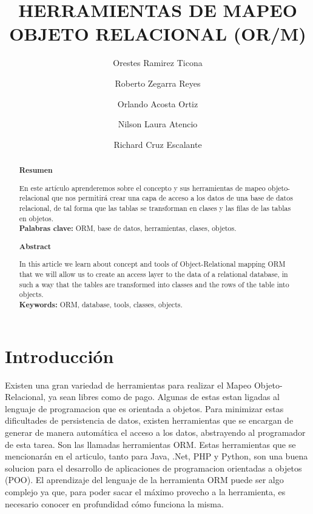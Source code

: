 \documentclass[%
 reprint,
 amsmath,amssymb,
 aps,
]{revtex4-1}
\begin{document}
\title{HERRAMIENTAS DE MAPEO OBJETO RELACIONAL (OR/M)}
\author{Orestes Ramirez Ticona}
\author{Roberto Zegarra Reyes}
\author{Orlando Acosta Ortiz}
\author{Nilson Laura Atencio}
\author{Richard Cruz Escalante}
%

\begin{abstract}
\begin{center}
\textbf{Resumen}
\end{center}
En este artículo aprenderemos sobre el concepto y sus herramientas de mapeo objeto-relacional que nos permitirá crear una capa de acceso a los datos de una base de datos relacional, de tal forma que las tablas se transforman en clases y las filas de las tablas en objetos.\\
\textbf{Palabras clave:}   ORM, base de datos, herramientas, clases, objetos.\\

\begin{center}
\textbf{Abstract}
\end{center}
In this article we learn about concept and tools of Object-Relational mapping ORM that we will allow us to create an access layer to the data of a relational database, in such a way that the tables are transformed into classes and the rows of the table into objects.\\
\textbf{Keywords:}   ORM, database, tools, classes, objects.

\end{abstract}



\maketitle


\section {Introducción}\label{sec:1}
Existen una gran variedad de herramientas para realizar el Mapeo Objeto-Relacional, ya sean libres como de pago. Algunas de estas estan ligadas al lenguaje de programacion que es orientada a objetos. Para minimizar estas dificultades de persistencia de datos, existen herramientas que se encargan de generar de manera automática el acceso a los datos, abstrayendo al programador de esta tarea. Son las llamadas herramientas ORM.
Estas herramientas que se mencionarán en el articulo, tanto para Java, .Net, PHP y Python, son una buena solucion para el desarrollo de aplicaciones de programacion orientadas a objetos (POO). 
El aprendizaje del lenguaje de la herramienta ORM puede ser algo complejo ya que, para poder sacar el máximo provecho a la herramienta, es necesario conocer en profundidad cómo funciona la misma.
\end{document}
